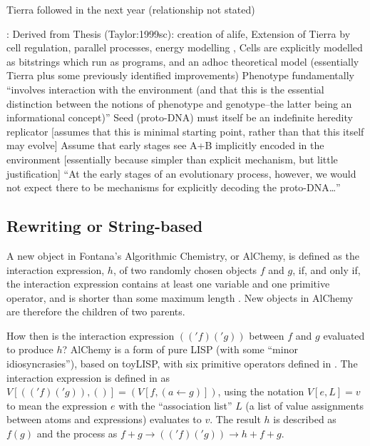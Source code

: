 Tierra followed in the next year (relationship not stated) \parencite{Ofria2004}


\parencite{Taylor2001}:
Derived from Thesis (Taylor:1999sc): creation of \gls{alife}, Extension of Tierra \cite{Ray1991} by cell regulation, parallel processes, energy modelling \cite[p.4]{Taylor:1999sc}, Cells are explicitly modelled as bitstrings which run as programs, and an adhoc theoretical model (essentially Tierra plus some previously identified improvements)
Phenotype fundamentally ``involves interaction with the environment (and that this is the essential distinction between the notions of phenotype and genotype--the latter being an informational concept)'' \parencite{Taylor2001}
Seed (proto-DNA) must itself be an indefinite heredity replicator {[}assumes that this is minimal starting point, rather than that this itself may evolve{]} \parencite{Taylor2001}
Assume that early stages see A+B implicitly encoded in the environment {[}essentially because simpler than explicit mechanism, but little justification{]} ``At the early stages of an evolutionary process, however, we would not expect there to be mechanisms for explicitly decoding the proto-DNA\ldots{}'' \parencite{Taylor2001}
		
\subsection{Rewriting or String-based}

\cite{Fontana1992}

A new object in Fontana's Algorithmic Chemistry, or AlChemy, is defined as the interaction expression, $h$, of two randomly chosen objects $f$ and $g$, if, and only if, the interaction expression contains at least one variable and one primitive operator, and is shorter than some maximum length \parencite[p.173--p.180]{Fontana1992}. New objects in AlChemy are therefore the children of two parents.

How then is the interaction expression $(('f)('g))$ between $f$ and $g$ evaluated to produce $h$? AlChemy is a form of pure LISP (with some ``minor idiosyncrasies''), based on toyLISP, with six primitive operators defined in \cite[p.205]{Fontana1992}. The interaction expression is defined in \cite[Definition A.9, p.204]{Fontana1992} as $V[(('f)('g)),()] = (V[f,(a\leftarrow g)])$, using the notation $V[e,L]=v$ to mean the expression $e$ with the ``association list'' $L$ (a list of value assignments between atoms and expressions) evaluates to $v$. The result $h$ is described as $f(g)$ and the process as $f+g \rightarrow (('f)('g)) \rightarrow h + f + g$.

